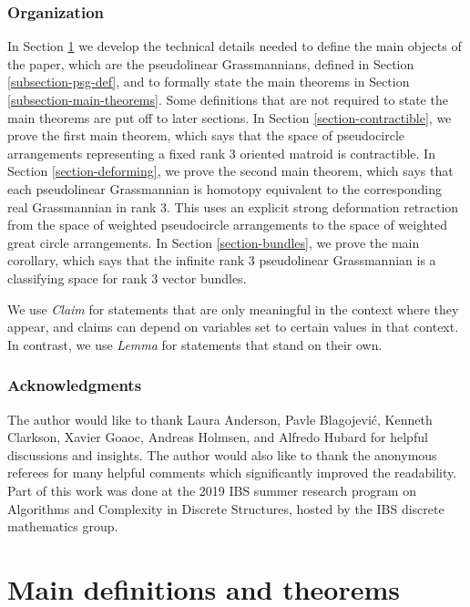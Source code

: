 \documentclass[11pt]{article}
\numberwithin{equation}{section}
\theoremstyle{remark}
\let\df\emph
\begin{document}
\subsubsection*{Organization}

In Section \ref{section-def} we develop the technical details needed to define the main objects of the paper, which are the pseudolinear Grassmannians, defined in Section \ref{subsection-psg-def}, and to formally state the main theorems in Section \ref{subsection-main-theorems}.
Some definitions that are not required to state the main theorems are put off to later sections.
In Section \ref{section-contractible}, we prove the first main theorem, which says that the space of pseudocircle arrangements representing a fixed rank $3$ oriented matroid is contractible.
In Section \ref{section-deforming}, we prove the second main theorem, which says that each pseudolinear Grassmannian is homotopy equivalent to the corresponding real Grassmannian in rank 3.
This uses an explicit strong deformation retraction from the space of weighted pseudocircle arrangements to the space of weighted great circle arrangements.
In Section \ref{section-bundles}, we prove the main corollary, which says that the infinite rank $3$ pseudolinear Grassmannian is a classifying space for rank $3$ vector bundles.

We use \df{Claim} for statements that are only meaningful in the context where they appear, and claims can depend on variables set to certain values in that context. In contrast, we use \df{Lemma} for statements that stand on their own.

\subsubsection*{Acknowledgments}

The author would like to thank
Laura Anderson,
Pavle Blagojević,
Kenneth Clarkson,
Xavier Goaoc,
Andreas Holmsen,
and Alfredo Hubard
for helpful discussions and insights.
The author would also like to thank the anonymous referees for many helpful comments which significantly improved the readability.
Part of this work was done at the 2019 IBS summer research program on Algorithms and Complexity in Discrete Structures, hosted by the IBS discrete mathematics group.

\section{Main definitions and theorems}\label{section-def}
\end{document}
